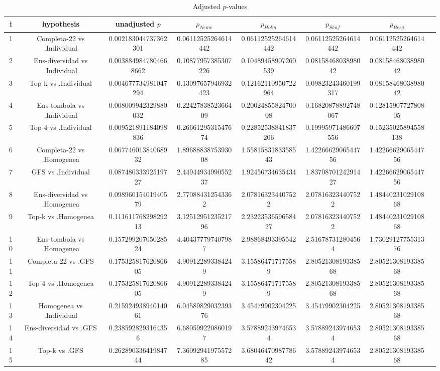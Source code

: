 \documentclass[a4paper,10pt]{article}
\begin{document}
\begin{landscape}
\begin{table}[!htp]
\centering\tiny
\caption{Adjusted $p$-values}
\begin{tabular}{cccccccc}
i&hypothesis&unadjusted $p$&$p_{Neme}$&$p_{Holm}$&$p_{Shaf}$&$p_{Berg}$\\
\hline
1&Completa-22 vs .Individual&0.002183044737362301&0.06112525264614442&0.06112525264614442&0.06112525264614442&0.06112525264614442\\
2&Ens-diversidad vs .Individual&0.0038849847804668662&0.10877957385307226&0.10489458907260539&0.0815846803898042&0.0815846803898042\\
3&Top-k vs .Individual&0.004677734981047294&0.13097657946932423&0.12162110950722964&0.09823243460199317&0.0815846803898042\\
4&Ens-tombola vs .Individual&0.008009942329880032&0.2242783852366409&0.2002485582470008&0.16820878892748067&0.1281590772780805\\
5&Top-4 vs .Individual&0.009521891184098836&0.2666129531547674&0.22852538841837206&0.19995971486607556&0.15235025894558138\\
6&Completa-22 vs .Homogenea&0.06774601384068932&1.8968883875393008&1.5581583183358543&1.4226662906544756&1.4226662906544756\\
7&GFS vs .Individual&0.08748033392519727&2.4494493499055237&1.92456734635434&1.8370870124291427&1.4226662906544756\\
8&Ens-diversidad vs .Homogenea&0.09896015401940579&2.770884312543362&2.078163234407522&2.078163234407522&1.4844023102910868\\
9&Top-k vs .Homogenea&0.11161176829829213&3.1251295123521796&2.2322353659658427&2.078163234407522&1.4844023102910868\\
10&Ens-tombola vs .Homogenea&0.15729920705028524&4.404377797407987&2.98868493395542&2.516787312804564&1.7302912775531376\\
11&Completa-22 vs .GFS&0.17532581762086605&4.909122893384249&3.155864717175589&2.8052130819338568&2.8052130819338568\\
12&Top-4 vs .Homogenea&0.17532581762086605&4.909122893384249&3.155864717175589&2.8052130819338568&2.8052130819338568\\
13&Homogenea vs .Individual&0.21592493894014061&6.0458982903239376&3.45479902304225&3.45479902304225&2.8052130819338568\\
14&Ens-diversidad vs .GFS&0.2385928293164356&6.680599220860197&3.578892439746534&3.578892439746534&2.8052130819338568\\
15&Top-k vs .GFS&0.26289033641984744&7.3609294197557285&3.6804647098778642&3.578892439746534&2.8052130819338568\\

\end{tabular}
\end{table}
\end{landscape}
\end{document}
